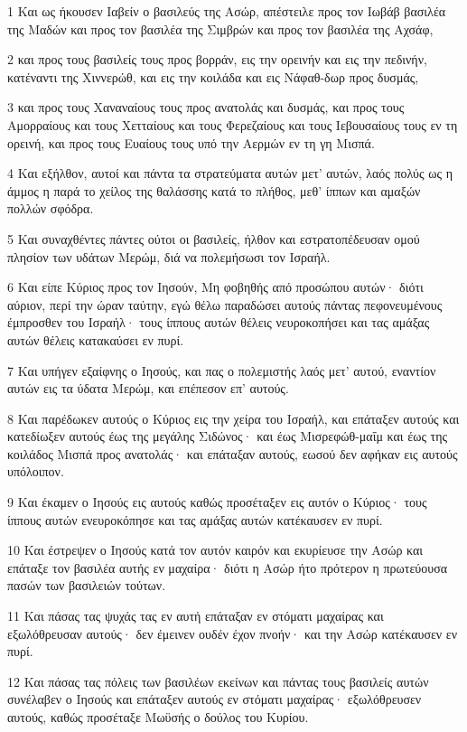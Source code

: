\par 1 Και ως ήκουσεν Ιαβείν ο βασιλεύς της Ασώρ, απέστειλε προς τον Ιωβάβ βασιλέα της Μαδών και προς τον βασιλέα της Σιμβρών και προς τον βασιλέα της Αχσάφ,
\par 2 και προς τους βασιλείς τους προς βορράν, εις την ορεινήν και εις την πεδινήν, κατέναντι της Χιννερώθ, και εις την κοιλάδα και εις Νάφαθ-δωρ προς δυσμάς,
\par 3 και προς τους Χαναναίους τους προς ανατολάς και δυσμάς, και προς τους Αμορραίους και τους Χετταίους και τους Φερεζαίους και τους Ιεβουσαίους τους εν τη ορεινή, και προς τους Ευαίους τους υπό την Αερμών εν τη γη Μισπά.
\par 4 Και εξήλθον, αυτοί και πάντα τα στρατεύματα αυτών μετ' αυτών, λαός πολύς ως η άμμος η παρά το χείλος της θαλάσσης κατά το πλήθος, μεθ' ίππων και αμαξών πολλών σφόδρα.
\par 5 Και συναχθέντες πάντες ούτοι οι βασιλείς, ήλθον και εστρατοπέδευσαν ομού πλησίον των υδάτων Μερώμ, διά να πολεμήσωσι τον Ισραήλ.
\par 6 Και είπε Κύριος προς τον Ιησούν, Μη φοβηθής από προσώπου αυτών· διότι αύριον, περί την ώραν ταύτην, εγώ θέλω παραδώσει αυτούς πάντας πεφονευμένους έμπροσθεν του Ισραήλ· τους ίππους αυτών θέλεις νευροκοπήσει και τας αμάξας αυτών θέλεις κατακαύσει εν πυρί.
\par 7 Και υπήγεν εξαίφνης ο Ιησούς, και πας ο πολεμιστής λαός μετ' αυτού, εναντίον αυτών εις τα ύδατα Μερώμ, και επέπεσον επ' αυτούς.
\par 8 Και παρέδωκεν αυτούς ο Κύριος εις την χείρα του Ισραήλ, και επάταξεν αυτούς και κατεδίωξεν αυτούς έως της μεγάλης Σιδώνος· και έως Μισρεφώθ-μαΐμ και έως της κοιλάδος Μισπά προς ανατολάς· και επάταξαν αυτούς, εωσού δεν αφήκαν εις αυτούς υπόλοιπον.
\par 9 Και έκαμεν ο Ιησούς εις αυτούς καθώς προσέταξεν εις αυτόν ο Κύριος· τους ίππους αυτών ενευροκόπησε και τας αμάξας αυτών κατέκαυσεν εν πυρί.
\par 10 Και έστρεψεν ο Ιησούς κατά τον αυτόν καιρόν και εκυρίευσε την Ασώρ και επάταξε τον βασιλέα αυτής εν μαχαίρα· διότι η Ασώρ ήτο πρότερον η πρωτεύουσα πασών των βασιλειών τούτων.
\par 11 Και πάσας τας ψυχάς τας εν αυτή επάταξαν εν στόματι μαχαίρας και εξωλόθρευσαν αυτούς· δεν έμεινεν ουδέν έχον πνοήν· και την Ασώρ κατέκαυσεν εν πυρί.
\par 12 Και πάσας τας πόλεις των βασιλέων εκείνων και πάντας τους βασιλείς αυτών συνέλαβεν ο Ιησούς και επάταξεν αυτούς εν στόματι μαχαίρας· εξωλόθρευσεν αυτούς, καθώς προσέταξε Μωϋσής ο δούλος του Κυρίου.
